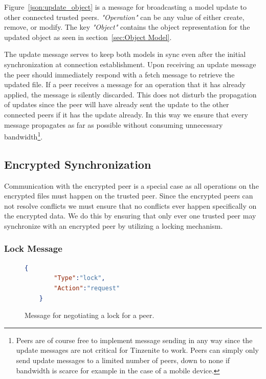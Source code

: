 Figure~\ref{json:update_object} is a message for broadcasting a model update to other connected trusted peers.
\textit{"Operation"} can be any value of either create, remove, or modify.
The key \textit{"Object"} contains the object representation for the updated object as seen in section~\ref{sec:Object Model}.

The update message serves to keep both models in sync even after the initial synchronization at connection establishment.
Upon receiving an update message the peer should immediately respond with a fetch message to retrieve the updated file.
If a peer receives a message for an operation that it has already applied, the message is silently discarded.
This does not disturb the propagation of updates since the peer will have already sent the update to the other connected peers if it has the update already.
In this way we ensure that every message propagates as far as possible without consuming unnecessary bandwidth\footnote{Peers are of course free to implement message sending in any way since the update messages are not critical for Tinzenite to work. Peers can simply only send update messages to a limited number of peers, down to none if bandwidth is scarce for example in the case of a mobile device.}.

\subsection{Encrypted Synchronization}
\label{sub:Encrypted Synchronization}

Communication with the encrypted peer is a special case as all operations on the encrypted files must happen on the trusted peer.
Since the encrypted peers can not resolve conflicts we must ensure that no conflicts ever happen specifically on the encrypted data.
We do this by ensuring that only ever one trusted peer may synchronize with an encrypted peer by utilizing a locking mechanism.

\subsubsection{Lock Message}
\label{subs:Lock Message}

\begin{figure}[htp]
    \begin{lstlisting}[language=json,firstnumber=0]
    {
        "Type":"lock",
        "Action":"request"
    }
    \end{lstlisting}
\caption[Lock Peer Message]{Message for negotiating a lock for a peer.}
\label{json:lock_peer}
\end{figure}

